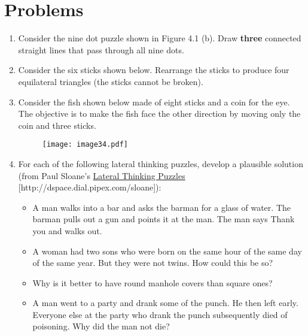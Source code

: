 \section{Problems}
\label{section:problems}

\begin{enumerate}
\def\labelenumi{\arabic{enumi}.}
\item
  Consider the nine dot puzzle shown in Figure 4.1 (b). Draw
  \textbf{three} connected straight lines that pass through all nine
  dots.

\item
  Consider the six sticks shown below. Rearrange the sticks to produce
  four equilat­eral triangles (the sticks cannot be broken).
\item
  Consider the fish shown below made of eight sticks and a coin for the
  eye. The objective is to make the fish face the other direction by
  moving only the coin and three sticks.

\begin{figure}
\texttt{[image: image34.pdf]}
\label{figure:dotsProblems}
\end{figure}

\item
  For each of the following lateral thinking puzzles, develop a
  plausible solution (from Paul Sloane's \ul{Lateral Thinking Puzzles}
  {[}http://dspace.dial.pipex.com/sloane{]}):

\begin{itemize}
\item
  A man walks into a bar and asks the barman for a glass of water. The
  barman pulls out a gun and points it at the man. The man says
  \textquotesingle Thank you\textquotesingle{} and walks out.
\item
  A woman had two sons who were born on the same hour of the same day of
  the same year. But they were not twins. How could this be so?
\item
  Why is it better to have round manhole covers than square ones?
\item
  A man went to a party and drank some of the punch. He then left early.
  Everyone else at the party who drank the punch subsequently died of
  poisoning. Why did the man not die?
\end{itemize}


\end{enumerate}
